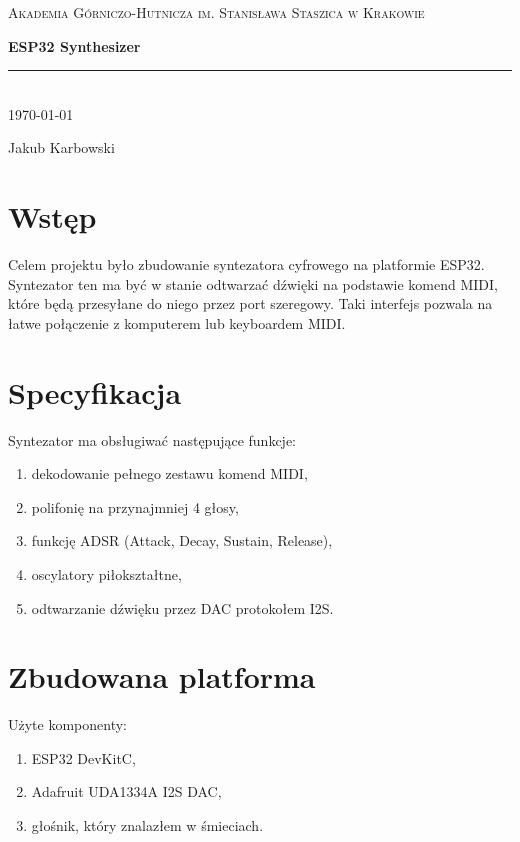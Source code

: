 \documentclass[12pt,a4paper,openright,dvipsnames]{mwart}
\newcommand{\vtitle}{ESP32 Synthesizer}
\newcommand{\vauthors}{
    Jakub Karbowski
}
\begin{document}
\begin{titlepage}
    \centering

    \textsc{Akademia Górniczo-Hutnicza im. Stanisława Staszica w Krakowie}


    {\LARGE\bfseries \vtitle\\}
    \rule{3in}{0.4pt} \\
    \today


    \large\vauthors


\end{titlepage}



\section{Wstęp}

Celem projektu było zbudowanie syntezatora cyfrowego na
platformie ESP32. Syntezator ten ma być w stanie odtwarzać
dźwięki na podstawie komend MIDI, które będą przesyłane
do niego przez port szeregowy.
Taki interfejs pozwala na łatwe połączenie z komputerem lub
keyboardem MIDI.


\section{Specyfikacja}

Syntezator ma obsługiwać następujące funkcje:
\begin{enumerate}
    \item dekodowanie pełnego zestawu komend MIDI,
    \item polifonię na przynajmniej 4 głosy,
    \item funkcję ADSR (Attack, Decay, Sustain, Release),
    \item oscylatory piłokształtne,
    \item odtwarzanie dźwięku przez DAC protokołem I2S.
\end{enumerate}


\section{Zbudowana platforma}

Użyte komponenty:
\begin{enumerate}
    \item ESP32 DevKitC,
    \item Adafruit UDA1334A I2S DAC,
    \item głośnik, który znalazłem w śmieciach.
\end{enumerate}
\end{document}
